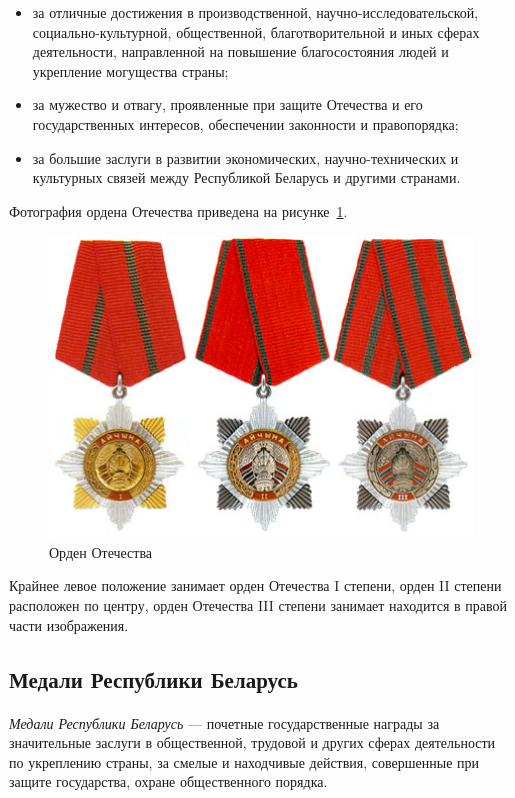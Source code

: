 \begin{itemize}
\item 
  за отличные достижения в производственной, научно-исследовательской,
  социально-культурной, общественной, благотворительной и иных сферах
  деятельности, направленной на повышение благосостояния людей и укрепление
  могущества страны;
\item
  за мужество и отвагу, проявленные при защите Отечества и его
  государственных интересов, обеспечении законности и правопорядка;
\item
  за большие заслуги в развитии экономических,
  научно-технических и культурных связей между Республикой Беларусь
  и другими странами.
\end{itemize}

Фотография ордена Отечества приведена на рисунке~\ref{fig:order_fatherland}.

\begin{figure}[h]
  \centering
  \includegraphics[width=150mm]{pic/order_fatherland.png}
  \caption{Орден Отечества}
  \label{fig:order_fatherland}
\end{figure}

Крайнее левое положение занимает орден Отечества I степени,
орден II степени расположен по центру, 
орден Отечества III степени занимает находится в правой части изображения.


\subsection{Медали Республики Беларусь}

\paragraph{}
\textit{Медали Республики Беларусь} --- почетные государственные награды за
значительные заслуги в общественной, трудовой и других сферах деятельности
по укреплению страны, за смелые и находчивые действия,
совершенные при защите государства, охране общественного порядка.

